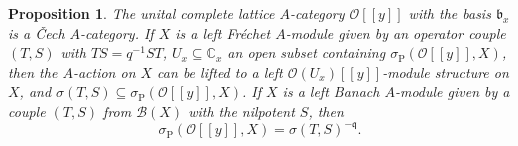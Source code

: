 \documentclass[12pt]{amsart}%
\theoremstyle{plain}
\newtheorem{proposition}{Proposition}
\numberwithin{equation}{section}
\numberwithin{equation}{section}
\numberwithin{theorem}{section}
\numberwithin{lemma}{section}
\numberwithin{remark}{section}
\numberwithin{example}{section}
\numberwithin{proposition}{section}
\numberwithin{definition}{section}
\numberwithin{corollary}{section}
\begin{document}
\begin{proposition}
\label{propCex2}The unital complete lattice $A$-category $\mathcal{O}\left[
\left[  y\right]  \right]  $ with the basis $\mathfrak{b}_{x}$ is a \v{C}ech
$A$-category. If $X$ is a left Fr\'{e}chet $A$-module given by an operator
couple $\left(  T,S\right)  $ with $TS=q^{-1}ST$, $U_{x}\subseteq
\mathbb{C}_{x}$ an open subset containing $\sigma_{\operatorname{P}}\left(
\mathcal{O}\left[  \left[  y\right]  \right]  ,X\right)  $, then the
$A$-action on $X$ can be lifted to a left $\mathcal{O}\left(  U_{x}\right)
\left[  \left[  y\right]  \right]  $-module structure on $X$, and
$\sigma\left(  T,S\right)  \subseteq\sigma_{\operatorname{P}}\left(
\mathcal{O}\left[  \left[  y\right]  \right]  ,X\right)  $. If $X$ is a left
Banach $A$-module given by a couple $\left(  T,S\right)  $ from $\mathcal{B}%
\left(  X\right)  $ with the nilpotent $S$, then
\[
\sigma_{\operatorname{P}}\left(  \mathcal{O}\left[  \left[  y\right]  \right]
,X\right)  =\sigma\left(  T,S\right)  ^{-\mathfrak{q}}.
\]

\end{proposition}
\end{document}
